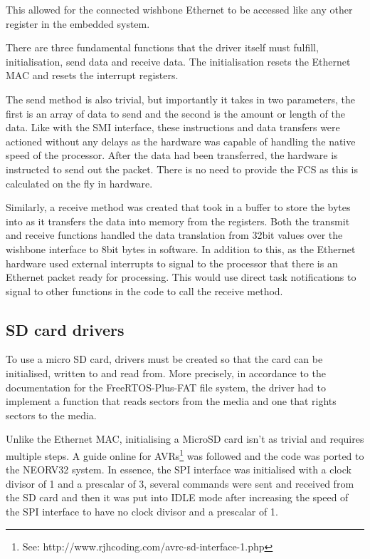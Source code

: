 \noindent This allowed for the connected wishbone Ethernet to be accessed like any other register in the embedded system. 


There are three fundamental functions that the driver itself must fulfill, initialisation, send data and receive data. The initialisation resets the Ethernet MAC and resets the interrupt registers. 

The send method is also trivial, but importantly it takes in two parameters, the first is an array of data to send and the second is the amount or length of the data. Like with the SMI interface, these instructions and data transfers were actioned without any delays as the hardware was capable of handling the native speed of the processor. After the data had been transferred, the hardware is instructed to send out the packet. There is no need to provide the FCS as this is calculated on the fly in hardware. 

Similarly, a receive method was created that took in a buffer to store the bytes into as it transfers the data into memory from the registers. Both the transmit and receive functions handled the data translation from 32bit values over the wishbone interface to 8bit bytes in software. In addition to this, as the Ethernet hardware used external interrupts to signal to the processor that there is an Ethernet packet ready for processing. This would use direct task notifications to signal to other functions in the code to call the receive method. 


\subsection{SD card drivers}
\label{sec:microsd_drivers}
To use a micro SD card, drivers must be created so that the card can be initialised, written to and read from. More precisely, in accordance to the  documentation for the FreeRTOS-Plus-FAT file system, the driver had to implement a function that reads sectors from the media and one that rights sectors to the media. 

Unlike the Ethernet MAC, initialising a MicroSD card isn't as trivial and requires multiple steps. A guide online for AVRs\footnote[1]{See: http://www.rjhcoding.com/avrc-sd-interface-1.php} was followed and the code was ported to the NEORV32 system. In essence, the SPI interface was initialised with a clock divisor of 1 and a prescalar of 3, several commands were sent and received from the SD card and then it was put into IDLE mode after increasing the speed of the SPI interface to have no clock divisor and a prescalar of 1.

